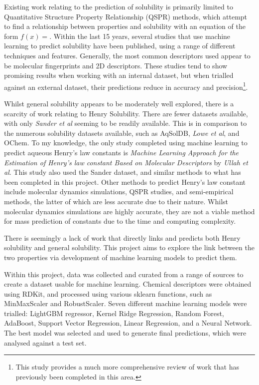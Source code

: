 \documentclass[11pt, titlepage]{article}
\begin{document}
Existing work relating to the prediction of solubility is primarily limited to Quantitative Structure Property Relationship (QSPR) methods, which attempt to find a relationship between properties and solubility with an equation of the form $f(x)=$. Within the last 15 years, several studies that use machine learning to predict solubility have been published, using a range of different techniques and features. Generally, the most common descriptors used appear to be molecular fingerprints and 2D descriptors. These studies tend to show promising results when working with an internal dataset, but when trialled against an external dataset, their predictions reduce in accuracy and precision\cite{Llompart2024}\footnote{This study provides a much more comprehensive review of work that has previously been completed in this area.}. 

Whilst general solubility appears to be moderately well explored, there is a scarcity of work relating to Henry Solubility. There are fewer datasets available, with only \textit{Sander et al}\cite{Sander} seeming to be readily available. This is in comparison to the numerous solubility datasets available, such as AqSolDB\cite{AqSolDB}, \textit{Lowe et al}\cite{LoweSol}, and OChem\cite{Sushko2011}. To my knowledge, the only study completed using machine learning to predict aqueous Henry's law constants is \textit{Machine Learning Approach for the Estimation of Henry's law constant Based on Molecular Descriptors} by \textit{Ullah et al}\cite{atmos15060706}. This study also used the Sander dataset, and similar methods to what has been completed in this project. Other methods to predict Henry's law constant include molecular dynamics simulations, QSPR studies, and semi-empirical methods, the latter of which are less accurate due to their nature. Whilst molecular dynamics simulations are highly accurate, they are not a viable method for mass prediction of constants due to the time and computing complexity\cite{Zhang2023}.

There is seemingly a lack of work that directly links and predicts both Henry solubility and general solubility. This project aims to explore the link between the two properties via development of machine learning models to predict them.

Within this project, data was collected and curated from a range of sources to create a dataset usable for machine learning. Chemical descriptors were obtained using RDKit\cite{RDKitDesc}, and processed using various sklearn\cite{scikit} functions, such as MinMaxScaler and RobustScaler. Seven different machine learning models were trialled: LightGBM regressor, Kernel Ridge Regression, Random Forest, AdaBoost, Support Vector Regression, Linear Regression, and a Neural Network. The best model was selected and used to generate final predictions, which were analysed against a test set. 
\end{document}
